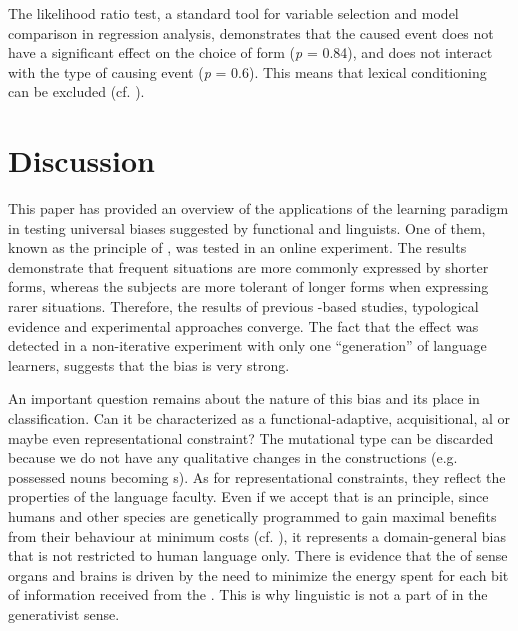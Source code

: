 \documentclass[output=paper]{langsci/langscibook}
\begin{document}
The likelihood ratio test, a standard tool for variable selection and model comparison in regression analysis, demonstrates that the caused event does not have a significant effect on the choice of form (\textit{p} = 0.84), and does not interact with the type of causing event (\textit{p} = 0.6). This means that lexical conditioning can be excluded (cf. \citealt{SmithWonnacott2010}). 

\section{Discussion}\label{sec:levshina:4}

This paper has provided an overview of the applications of the  learning paradigm in testing universal biases suggested by functional and  linguists. One of them, known as the principle of , was tested in an online experiment. The results demonstrate that frequent  situations are more commonly expressed by shorter forms, whereas the subjects are more tolerant of longer forms when expressing rarer  situations. Therefore, the results of previous -based studies, typological evidence and experimental approaches converge. The fact that the effect was detected in a non-iterative experiment with only one “generation” of language learners, suggests that the bias is very strong.

An important question remains about the nature of this bias and its place in  classification. Can it be characterized as a functional-adaptive, acquisitional, al or maybe even representational constraint? The mutational type can be discarded because we do not have any qualitative changes in the constructions (e.g. possessed nouns becoming s). As for representational constraints, they reflect the properties of the  language faculty. Even if we accept that  is an  principle, since humans and other species are genetically programmed to gain maximal benefits from their behaviour at minimum costs (cf. \citealt{ParkerSmith1990}), it represents a domain-general bias that is not restricted to human language only. There is evidence that the  of sense organs and brains is driven by the need to minimize the energy spent for each bit of information received from the  \citep[3]{Stone2015}. This is why linguistic  is not a part of  in the generativist sense. 
\end{document}
